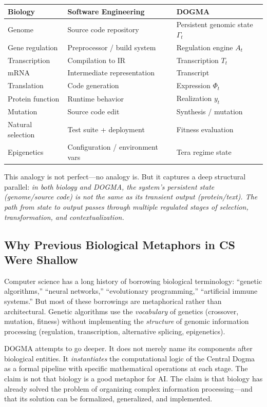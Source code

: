 \begin{center}
\renewcommand{\arraystretch}{1.15}
\begin{tabularx}{0.95\textwidth}{L{3.5cm} L{3.5cm} Y}
\toprule
\textbf{Biology} & \textbf{Software Engineering} & \textbf{DOGMA} \\
\midrule
Genome & Source code repository & Persistent genomic state $\Gamma_t$ \\
Gene regulation & Preprocessor / build system & Regulation engine $A_t$ \\
Transcription & Compilation to IR & Transcription $T_t$ \\
mRNA & Intermediate representation & Transcript \\
Translation & Code generation & Expression $\Phi_t$ \\
Protein function & Runtime behavior & Realization $y_t$ \\
Mutation & Source code edit & Synthesis / mutation \\
Natural selection & Test suite + deployment & Fitness evaluation \\
Epigenetics & Configuration / environment vars & Tera regime state \\
\bottomrule
\end{tabularx}
\end{center}

This analogy is not perfect---no analogy is. But it captures a deep structural parallel: \emph{in both biology and DOGMA, the system's persistent state (genome/source code) is not the same as its transient output (protein/text). The path from state to output passes through multiple regulated stages of selection, transformation, and contextualization.}

\subsection{Why Previous Biological Metaphors in CS Were Shallow}

Computer science has a long history of borrowing biological terminology: ``genetic algorithms,'' ``neural networks,'' ``evolutionary programming,'' ``artificial immune systems.'' But most of these borrowings are metaphorical rather than architectural. Genetic algorithms use the \emph{vocabulary} of genetics (crossover, mutation, fitness) without implementing the \emph{structure} of genomic information processing (regulation, transcription, alternative splicing, epigenetics).

DOGMA attempts to go deeper. It does not merely name its components after biological entities. It \emph{instantiates} the computational logic of the Central Dogma as a formal pipeline with specific mathematical operations at each stage. The claim is not that biology is a good metaphor for AI. The claim is that biology has already solved the problem of organizing complex information processing---and that its solution can be formalized, generalized, and implemented.

